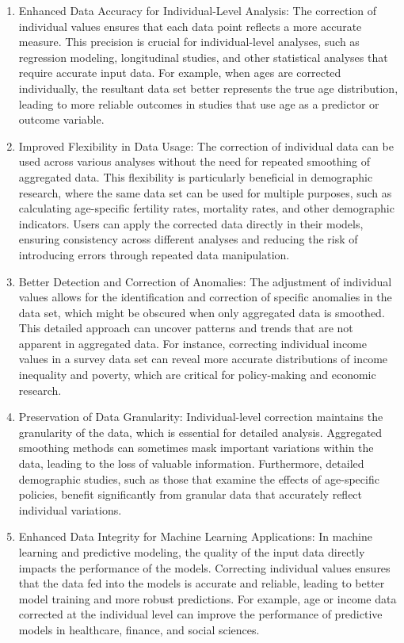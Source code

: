 \documentclass[pdflatex,sn-mathphys-num]{sn-jnl}%
\theoremstyle{thmstyleone}%
\theoremstyle{thmstyletwo}%
\theoremstyle{thmstylethree}%
\begin{document}
\begin{enumerate}
\item Enhanced Data Accuracy for Individual-Level Analysis:
   The correction of individual values ensures that each data point reflects a more accurate measure. This precision is crucial for individual-level analyses, such as regression modeling, longitudinal studies, and other statistical analyses that require accurate input data. For example, when ages are corrected individually, the resultant data set better represents the true age distribution, leading to more reliable outcomes in studies that use age as a predictor or outcome variable.
\item Improved Flexibility in Data Usage:
   The correction of individual data can be used across various analyses without the need for repeated smoothing of aggregated data. This flexibility is particularly beneficial in demographic research, where the same data set can be used for multiple purposes, such as calculating age-specific fertility rates, mortality rates, and other demographic indicators. Users can apply the corrected data directly in their models, ensuring consistency across different analyses and reducing the risk of introducing errors through repeated data manipulation.
\item Better Detection and Correction of Anomalies:
   The adjustment of individual values allows for the identification and correction of specific anomalies in the data set, which might be obscured when only aggregated data is smoothed. This detailed approach can uncover patterns and trends that are not apparent in aggregated data. For instance, correcting individual income values in a survey data set can reveal more accurate distributions of income inequality and poverty, which are critical for policy-making and economic research.
\item Preservation of Data Granularity:
   Individual-level correction maintains the granularity of the data, which is essential for detailed analysis. Aggregated smoothing methods can sometimes mask important variations within the data, leading to the loss of valuable information. Furthermore, detailed demographic studies, such as those that examine the effects of age-specific policies, benefit significantly from granular data that accurately reflect individual variations.
\item Enhanced Data Integrity for Machine Learning Applications:
   In machine learning and predictive modeling, the quality of the input data directly impacts the performance of the models. Correcting individual values ensures that the data fed into the models is accurate and reliable, leading to better model training and more robust predictions. For example, age or income data corrected at the individual level can improve the performance of predictive models in healthcare, finance, and social sciences.

\end{enumerate}
\end{document}
